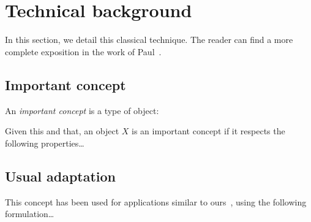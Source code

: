 %



\section{Technical background}
%
In this section, we detail this classical technique. The reader can find a more complete exposition in the work of Paul~\cite{Sibgrapi2014}.


\subsection{Important concept}
%
An \emph{important concept} is a type of object:
\begin{definition}
Given this and that, an object $X$ is an important concept if it respects the following properties\ldots{}
\end{definition}


\subsection{Usual adaptation}
%
This concept has been used for applications similar to ours~\cite{Sibgrapi2014}, using the following formulation\ldots{}